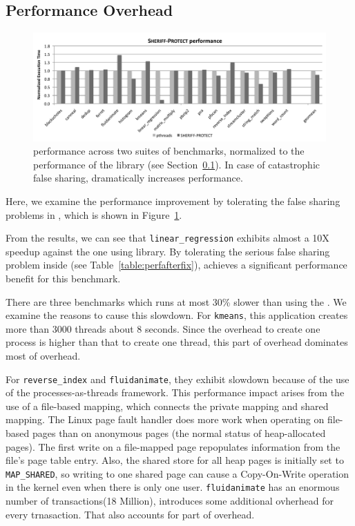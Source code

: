 \subsection{\SheriffProtect{} Performance Overhead}
\label{sec:results-runtime-overhead}

\begin{figure}[!t]
\centering
\includegraphics[width=5in]{sheriff/figure/patrolperf.pdf}
\caption{\sheriffprotect{} performance across two suites of benchmarks,
  normalized to the performance of the \pthreads{} library (see
  Section~\ref{sec:results-runtime-overhead}). In case of
  catastrophic false sharing, \sheriffdetect{} dramatically increases performance.
\label{fig:patrol}}
\end{figure}

Here, we examine the performance improvement by tolerating the false sharing problems in \sheriffprotect{}, which is shown in Figure~\ref{fig:patrol}.  

From the results, we can see that \texttt{linear\_regression} exhibits almost a 10X speedup against the one using \pthreads{} library. By tolerating the serious false sharing problem inside (see Table~\ref{table:perfafterfix}), \sheriffprotect{} achieves a significant performance 
benefit for this benchmark.

There are three benchmarks which runs at most 30\% slower than using the \pthreads{}. We examine the reasons to cause this slowdown. For \texttt{kmeans}, this application creates more than 3000 threads about 8 seconds. Since the overhead
to create one process is higher than that to create one thread, this part of overhead dominates most of overhead. 

For \texttt{reverse\_index} and \texttt{fluidanimate}, 
they exhibit slowdown because of the use of the processes-as-threads framework. This performance impact arises from the use of a file-based mapping, which connects the private mapping and shared mapping. The Linux page fault handler does more
work when operating on file-based pages than on anonymous pages (the normal status of heap-allocated pages). The first write on a file-mapped page repopulates information from the file's page table entry. Also, the shared store for all heap pages is initially set to \texttt{MAP\_SHARED}, so writing to one shared page can cause a Copy-On-Write operation in the kernel even when there is only one user.
\texttt{fluidanimate} has an enormous number of transactions(18 Million), \sheriffprotect{} 
introduces some additional ovherhead for every trnasaction. That also accounts for part of
overhead.

